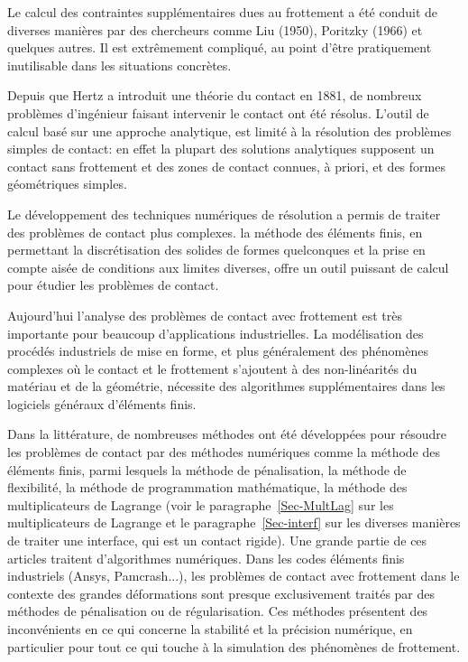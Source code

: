 \begin{histoire}
\medskip
Le calcul des contraintes supplémentaires dues au frottement a été conduit de diverses manières
par des chercheurs comme Liu (1950),
Poritzky (1966) et quelques autres.
Il est extrêmement compliqué, au point d'être pratiquement inutilisable dans les situations
concrètes.
\end{histoire}

\medskip
Depuis que Hertz a introduit une théorie
du contact en 1881, de nombreux problèmes d'ingénieur faisant intervenir le contact ont été résolus.
L'outil de calcul basé sur une approche analytique, est limité à la résolution des problèmes
simples de contact: en effet la plupart des solutions analytiques supposent un contact sans frottement
et des zones de contact connues, à priori, et des formes géométriques simples.

Le développement des techniques numériques de résolution a permis de traiter des
problèmes de contact plus complexes.
la méthode des éléments finis, en permettant la discrétisation des solides de formes quelconques et la prise en
compte aisée de conditions aux limites diverses, offre un outil puissant de calcul pour
étudier les problèmes de contact.

\medskip
Aujourd'hui l'analyse des problèmes de contact avec frottement est très importante
pour beaucoup d'applications industrielles.
La modélisation des procédés industriels de mise en forme, et plus généralement des
phénomènes complexes où le contact et le frottement s'ajoutent à des non-linéarités
du matériau et de la géométrie, nécessite des algorithmes supplémentaires dans les
logiciels généraux d'éléments finis.

\medskip
{}

\medskip
Dans la littérature, de nombreuses méthodes ont été développées pour résoudre les problèmes
de contact par des méthodes numériques comme la méthode des éléments finis, parmi lesquels la méthode de pénalisation,
la méthode de flexibilité, la méthode de programmation mathématique, la méthode des
multiplicateurs de
Lagrange
(voir le paragraphe~\ref{Sec-MultLag} sur les multiplicateurs de Lagrange et le
paragraphe~\ref{Sec-interf} sur les diverses manières de traiter une interface, qui est un
contact rigide).
Une grande partie de ces articles traitent d'algorithmes numériques.
Dans les codes éléments finis industriels (Ansys, Pamcrash...), les problèmes de contact avec frottement dans le
contexte des grandes déformations sont presque exclusivement traités par des méthodes de pénalisation
ou de régularisation. Ces méthodes présentent des inconvénients en ce qui concerne la stabilité
et la précision numérique, en particulier pour tout ce qui touche à la simulation des phénomènes de
frottement.

